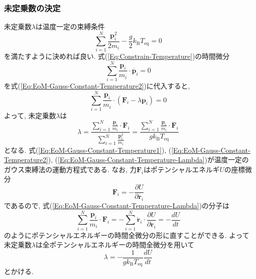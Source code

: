 \subsubsection{未定乗数の決定}
未定乗数$\lambda$は温度一定の束縛条件
\begin{equation}
    \sum_{i=1}^{N}
    \frac{\bm{p}_{i}^{2}}{2m_{i}}
    -
    \frac{g}{2} k_{\mathrm{B}} T_{\mathrm{eq}}
    =
    0
    \label{Eq:Constrain-Temperature}
\end{equation}
を満たすように決めれば良い.
式(\ref{Eq:Constrain-Temperature})の時間微分
\begin{equation}
    \sum_{i=1}^{N}
    \frac{\bm{p}_{i}}{m_{i}} \cdot \dot{\bm{p}_{i}}
    =
    0
\end{equation}
を式(\ref{Eq:EoM-Gauss-Constant-Temperature2})に代入すると,
\begin{equation}
    \sum_{i=1}^{N}
    \frac{\bm{p}_{i}}{m_{i}}
    \cdot
    \left( \bm{F}_{i} - \lambda \bm{p}_{i}\right)
    =
    0
\end{equation}
よって, 未定乗数$\lambda$は
\begin{equation}
    \lambda
    =
    \frac
    {\sum_{i=1}^{N} \frac{\bm{p}_{i}}{m_{i}} \cdot \bm{F}_{i}}
    {\sum_{i=1}^{N} \frac{\bm{p}_{i}^{2}}{m_{i}}}
    =
    \frac
    {\sum_{i=1}^{N} \frac{\bm{p}_{i}}{m_{i}} \cdot \bm{F}_{i}}
    {g k_{\mathrm{B}} T_{\mathrm{eq}}}
    \label{Eq:EoM-Gauss-Constant-Temperature-Lambda}
\end{equation}
となる. 式(\ref{Eq:EoM-Gauss-Constant-Temperature1}), (\ref{Eq:EoM-Gauss-Constant-Temperature2}), (\ref{Eq:EoM-Gauss-Constant-Temperature-Lambda})が温度一定のガウス束縛法の運動方程式である.
なお, 力$\bm{F}_{i}$はポテンシャルエネルギ$U$の座標微分
\begin{equation}
    \bm{F}_{i}
    =
    -
    \frac{\partial U}{\partial \bm{r}_{i}}
\end{equation}
であるので, 式(\ref{Eq:EoM-Gauss-Constant-Temperature-Lambda})の分子は
\begin{equation}
    \sum_{i=1}^{N}
    \frac{\bm{p}_{i}}{m_{i}} \cdot \bm{F}_{i}
    =
    -\sum_{i=1}^{N}
    \dot{\bm{r}}_{i} \cdot
    \frac{\partial U}{\partial \bm{r}_{i}}
    =
    -
    \frac{dU}{dt}
\end{equation}
のようにポテンシャルエネルギーの時間全微分の形に直すことができる.
よって未定乗数$\lambda$は全ポテンシャルエネルギーの時間全微分を用いて
\begin{equation}
    \lambda
    =
    -
    \frac
    {1}{g k_{\mathrm{B}} T_{\mathrm{eq}}}
    \frac{dU}{dt}
    \label{Eq:EoM-Gauss-Constant-Temperature-Lambda2}
\end{equation}
とかける.

